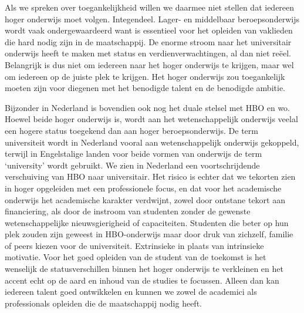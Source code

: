 \documentclass{jote-book}
\begin{document}
	Als we spreken over toegankelijkheid willen we daarmee niet stellen dat iedereen hoger onderwijs moet volgen. Integendeel. Lager- en middelbaar beroepsonderwijs wordt vaak ondergewaardeerd want is essentieel voor het opleiden van vaklieden die hard nodig zijn in de maatschappij. De enorme stroom naar het universitair onderwijs heeft te maken met status en verdienverwachtingen, al dan niet reëel. Belangrijk is dus niet om iedereen naar het hoger onderwijs te krijgen, maar wel om iedereen op de juiste plek te krijgen. Het hoger onderwijs zou toegankelijk moeten zijn voor diegenen met het benodigde talent en de benodigde ambitie.



	Bijzonder in Nederland is bovendien ook nog het duale stelsel met HBO en wo. Hoewel beide hoger onderwijs is, wordt aan het wetenschappelijk onderwijs veelal een hogere status toegekend dan aan hoger beroepsonderwijs. De term universiteit wordt in Nederland vooral aan wetenschappelijk onderwijs gekoppeld, terwijl in Engelstalige landen voor beide vormen van onderwijs de term ‘university' wordt gebruikt. We zien in Nederland een voortschrijdende verschuiving van HBO naar universitair. Het risico is echter dat we tekorten zien in hoger opgeleiden met een professionele focus, en dat voor het academische onderwijs het academische karakter verdwijnt, zowel door ontstane tekort aan financiering, als door de instroom van studenten zonder de gewenste wetenschappelijke nieuwsgierigheid of capaciteiten. Studenten die beter op hun plek zouden zijn geweest in HBO-onderwijs maar door druk van zichzelf, familie of peers kiezen voor de universiteit. Extrinsieke in plaats van intrinsieke motivatie. Voor het goed opleiden van de student van de toekomst is het wenselijk de statusverschillen binnen het hoger onderwijs te verkleinen en het accent echt op de aard en inhoud van de studies te focussen. Alleen dan kan iedereen talent goed ontwikkelen en kunnen we zowel de academici als professionals opleiden die de maatschappij nodig heeft.
\end{document}
